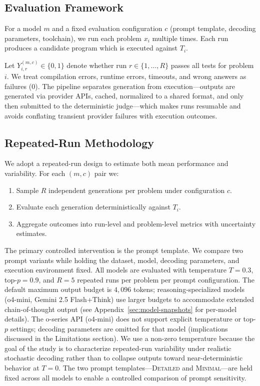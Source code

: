 \documentclass{article}
\begin{document}
\subsection{Evaluation Framework}
For a model $m$ and a fixed evaluation configuration $c$ (prompt template, decoding parameters, toolchain), we run each problem $x_i$ multiple times. Each run produces a candidate program which is executed against $T_i$.

Let $Y_{i,r}^{(m,c)} \in \{0,1\}$ denote whether run $r \in \{1,\dots,R\}$ passes all tests for problem $i$. We treat compilation errors, runtime errors, timeouts, and wrong answers as failures ($0$). The pipeline separates generation from execution---outputs are generated via provider APIs, cached, normalized to a shared format, and only then submitted to the deterministic judge---which makes runs resumable and avoids conflating transient provider failures with execution outcomes.

\subsection{Repeated-Run Methodology}
We adopt a repeated-run design to estimate both mean performance and variability. For each $(m,c)$ pair we:
\begin{enumerate}
  \item Sample $R$ independent generations per problem under configuration $c$.
  \item Evaluate each generation deterministically against $T_i$.
  \item Aggregate outcomes into run-level and problem-level metrics with uncertainty estimates.
\end{enumerate}

The primary controlled intervention is the prompt template. We compare two prompt variants while holding the dataset, model, decoding parameters, and execution environment fixed. All models are evaluated with temperature $T=0.3$, top-$p=0.9$, and $R=5$ repeated runs per problem per prompt configuration. The default maximum output budget is $4{,}096$ tokens; reasoning-specialized models (o4-mini, Gemini 2.5 Flash+Think) use larger budgets to accommodate extended chain-of-thought output (see Appendix~\ref{sec:model-snapshots} for per-model details). The o-series API (o4-mini) does not support explicit temperature or top-$p$ settings; decoding parameters are omitted for that model (implications discussed in the Limitations section). We use a non-zero temperature because the goal of the study is to characterize repeated-run variability under realistic stochastic decoding rather than to collapse outputs toward near-deterministic behavior at $T=0$. The two prompt templates---\textsc{Detailed} and \textsc{Minimal}---are held fixed across all models to enable a controlled comparison of prompt sensitivity.
\end{document}
